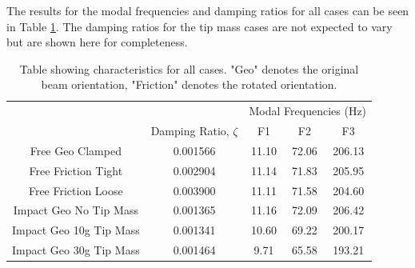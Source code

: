 \documentclass[11pt]{article}
\begin{document}
The results for the modal frequencies and damping ratios for all cases can be seen in Table \ref{tab:1res}. The damping ratios for the tip mass cases are not expected to vary but are shown here for completeness.
\begin{table}[H]

\caption{Table showing characteristics for all cases. "Geo" denotes the original beam orientation, "Friction" denotes the rotated orientation.}
\centering
\begin{tabular}{|c|c|c|c|c|}
\hline
\rowcolor[HTML]{CBCEFB} 
\cellcolor[HTML]{CBCEFB}                       & \cellcolor[HTML]{CBCEFB}                                         & \multicolumn{3}{c|}{\cellcolor[HTML]{CBCEFB}Modal Frequencies (Hz)} \\ \cline{3-5} 
\rowcolor[HTML]{CBCEFB} 
\multirow{-2}{*}{\cellcolor[HTML]{CBCEFB}Case} & \multirow{-2}{*}{\cellcolor[HTML]{CBCEFB}Damping Ratio, $\zeta$} & F1                   & F2                   & F3                    \\ \hline
Free Geo Clamped                               & 0.001566                                                         & 11.10                & 72.06                & 206.13                \\ \hline
Free Friction Tight                            & 0.002904                                                        & 11.14                & 71.83                & 205.95                \\ \hline
Free Friction Loose                            & 0.003900                                           & 11.11                & 71.58                & 204.60                \\ \hline
Impact Geo No Tip Mass                         & 0.001365
                                                       & 11.16                & 72.09                & 206.42                \\ \hline
Impact Geo 10g Tip Mass                        & 0.001341                                                         & 10.60                & 69.22                & 200.17                \\ \hline
Impact Geo 30g Tip Mass                        & 0.001464                                                         & 9.71                 & 65.58                & 193.21                \\ \hline
\end{tabular}
\label{tab:1res}
\end{table}
\end{document}
